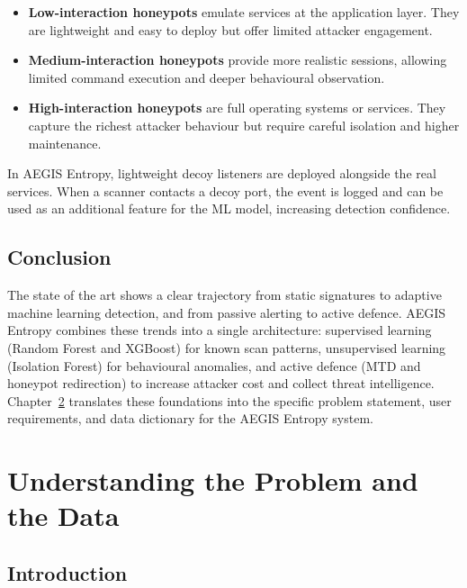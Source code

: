 \documentclass[12pt,a4paper]{report}
\begin{document}
\begin{itemize}
    \item \textbf{Low-interaction honeypots} emulate services at the application layer. They are lightweight and easy to deploy but offer limited attacker engagement.
    \item \textbf{Medium-interaction honeypots} provide more realistic sessions, allowing limited command execution and deeper behavioural observation.
    \item \textbf{High-interaction honeypots} are full operating systems or services. They capture the richest attacker behaviour but require careful isolation and higher maintenance.
\end{itemize}

In AEGIS Entropy, lightweight decoy listeners are deployed alongside the real services. When a scanner contacts a decoy port, the event is logged and can be used as an additional feature for the ML model, increasing detection confidence.

\section{Conclusion}\label{sec:soa_conclusion}

The state of the art shows a clear trajectory from static signatures to adaptive machine learning detection, and from passive alerting to active defence. AEGIS Entropy combines these trends into a single architecture: supervised learning (Random Forest and XGBoost) for known scan patterns, unsupervised learning (Isolation Forest) for behavioural anomalies, and active defence (MTD and honeypot redirection) to increase attacker cost and collect threat intelligence. Chapter~\ref{ch:understanding} translates these foundations into the specific problem statement, user requirements, and data dictionary for the AEGIS Entropy system.

\chapter{Understanding the Problem and the Data}\label{ch:understanding}

\section{Introduction}
\end{document}
